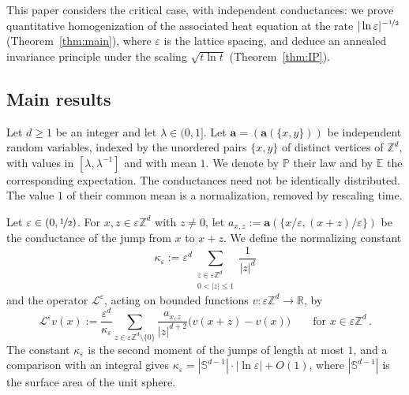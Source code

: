 \documentclass[11pt]{amsart}
\numberwithin{equation}{section}
\newcommand{\Z}{\mathbb{Z}}
\newcommand{\R}{\mathbb{R}}
\newcommand{\E}{\mathbb{E}}
\newcommand{\PP}{\mathbb{P}}
\newcommand{\ba}{\mathbf{a}}
\newcommand{\eps}{\varepsilon}
\newcommand{\Leps}{\mathcal{L}^\varepsilon}
\newcommand{\nf}{\nicefrac}
\begin{document}
This paper considers the critical case, with independent conductances: we prove quantitative homogenization of the associated heat equation at the rate $|\ln \eps|^{-\nf12}$ (Theorem~\ref{thm:main}), where $\eps$ is the lattice spacing, and deduce an annealed invariance principle under the scaling $\sqrt{t \ln t}$ (Theorem~\ref{thm:IP}).

\subsection{Main results}

Let $d \geq 1$ be an integer and let $\lambda \in (0,1]$.
Let $\ba = (\ba(\{x,y\}))$ be independent random variables, indexed by the unordered pairs $\{x,y\}$ of distinct vertices of $\Z^d$, with values in $[\lambda, \lambda^{-1}]$ and with mean $1$.
We denote by $\PP$ their law and by $\E$ the corresponding expectation.
The conductances need not be identically distributed.
The value $1$ of their common mean is a normalization, removed by rescaling time.

Let $\eps \in (0, \nf12)$.
For $x, z \in \eps \Z^d$ with $z \neq 0$, let $a_{x,z} := \ba(\{x/\eps, (x+z)/\eps\})$ be the conductance of the jump from $x$ to $x + z$.
We define the normalizing constant
\begin{equation} \label{eq:def.kappa}
    \kappa_\eps := \eps^d \sum_{\substack{z \in \eps \Z^d \\ 0 < |z| \leq 1}} \frac{1}{|z|^d}
\end{equation}
and the operator $\Leps$, acting on bounded functions $v \colon \eps \Z^d \to \R$, by
\begin{equation} \label{eq:def.Leps}
    \Leps v(x) := \frac{\eps^d}{\kappa_\eps}
    \sum_{z \in \eps \Z^d \setminus \{0\}}
    \frac{a_{x,z}}{|z|^{d+2}}
    \bigl( v(x + z) - v(x) \bigr) \qquad \text{for } x \in \eps \Z^d\,.
\end{equation}
The constant $\kappa_\eps$ is the second moment of the jumps of length at most $1$, and a comparison with an integral gives $\kappa_\eps = |\mathbb{S}^{d-1}| \cdot |\ln \eps| + O(1)$, where $|\mathbb{S}^{d-1}|$ is the surface area of the unit sphere.
\end{document}
